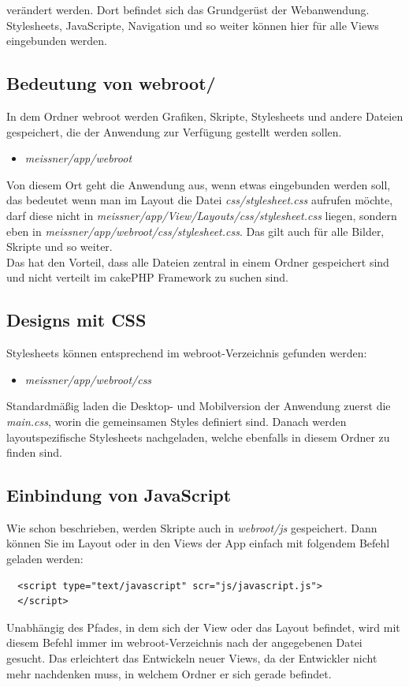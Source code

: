 verändert werden. Dort befindet sich das Grundgerüst der Webanwendung. Stylesheets, JavaScripte, Navigation und so weiter können hier für alle Views eingebunden werden. 

\subsection{Bedeutung von webroot/}
In dem Ordner webroot werden Grafiken, Skripte, Stylesheets und andere Dateien gespeichert, die der Anwendung zur Verfügung gestellt werden sollen. 

\begin{itemize}
	\item[] \emph{meissner/app/webroot}
\end{itemize}

Von diesem Ort geht die Anwendung aus, wenn etwas eingebunden werden soll, das bedeutet wenn man im Layout die Datei \emph{css/stylesheet.css} aufrufen möchte, darf diese nicht in \emph{meissner/app/View/Layouts/css/stylesheet.css} liegen, sondern eben in \emph{meissner/app/webroot/css/stylesheet.css}. Das gilt auch für alle Bilder, Skripte und so weiter.\\
Das hat den Vorteil, dass alle Dateien zentral in einem Ordner gespeichert sind und nicht verteilt im cakePHP Framework zu suchen sind.

\subsection{Designs mit CSS}
Stylesheets können entsprechend im webroot-Verzeichnis gefunden werden:

\begin{itemize}
	\item[] \emph{meissner/app/webroot/css}
\end{itemize}

Standardmäßig laden die Desktop- und Mobilversion der Anwendung zuerst die \emph{main.css}, worin die gemeinsamen Styles definiert sind. Danach werden layoutspezifische Stylesheets nachgeladen, welche ebenfalls in diesem Ordner zu finden sind. 

\subsection{Einbindung von JavaScript}
Wie schon beschrieben, werden Skripte auch in \emph{webroot/js} gespeichert. Dann können Sie im Layout oder in den Views der App einfach mit folgendem Befehl geladen werden:

\begin{lstlisting}
  <script type="text/javascript" scr="js/javascript.js">
  </script>
\end{lstlisting}

Unabhängig des Pfades, in dem sich der View oder das Layout befindet, wird mit diesem Befehl immer im webroot-Verzeichnis nach der angegebenen Datei gesucht. Das erleichtert das Entwickeln neuer Views, da der Entwickler nicht mehr nachdenken muss, in welchem Ordner er sich gerade befindet.






